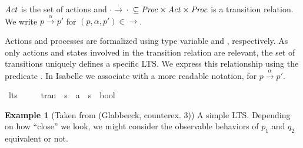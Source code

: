 \begin{isabellebody}
\begin{isamarkuptext}
$\mathit{Act}$ is the set of actions and $\cdot\xrightarrow{\cdot}\cdot$ $\subseteq \mathit{Proc} \times \mathit{Act} \times \mathit{Proc}$ is a transition relation.
We write $p \xrightarrow{\alpha} p'$ for $(p, \alpha, p')\in \rightarrow$.%
\end{isamarkuptext}\isamarkuptrue%
%
\begin{isamarkuptext}%
Actions and processes are formalized using type variable  and , respectively. As only actions and states involved in the transition relation are relevant, 
the set of transitions uniquely defines a specific LTS. We express this relationship using the predicate . In Isabelle we associate  with a more readable notation,  for $p \xrightarrow{\alpha} p'$.%
\end{isamarkuptext}\isamarkuptrue%
\isamarkupfalse%
\ lts\ {\isacharequal}{\kern0pt}\ \isanewline
\ \ \ tran\ {\isacharcolon}{\kern0pt}{\isacharcolon}{\kern0pt}\ {\isacartoucheopen}{\isacharprime}{\kern0pt}s\ {\isasymRightarrow}\ {\isacharprime}{\kern0pt}a\ {\isasymRightarrow}\ {\isacharprime}{\kern0pt}s\ {\isasymRightarrow}\ bool{\isacartoucheclose}\ \isanewline
\ \ \ \ {\isacharparenleft}{\kern0pt}{\isachardoublequoteopen}{\isacharunderscore}{\kern0pt}\ {\isasymmapsto}{\isacharunderscore}{\kern0pt}\ {\isacharunderscore}{\kern0pt}{\isachardoublequoteclose}\ {\isacharbrackleft}{\kern0pt}{}{}{\isacharcomma}{\kern0pt}\ {}{}{\isacharcomma}{\kern0pt}\ {}{}{\isacharbrackright}{\kern0pt}\ {}{}{\isacharparenright}{\kern0pt}\isanewline
{}%
\begin{isamarkuptext}%
\textbf{Example 1} (Taken from (Glabbeeck, counterex. 3)) A simple LTS. Depending on how ``close'' we look, we might consider the observable behaviors of $p_1$ and $q_2$ equivalent or not.%
\end{isamarkuptext}\isamarkuptrue%
%
\begin{isamarkuptext}%
\begin{center}
\end{center}
\end{isamarkuptext}
\end{isabellebody}
